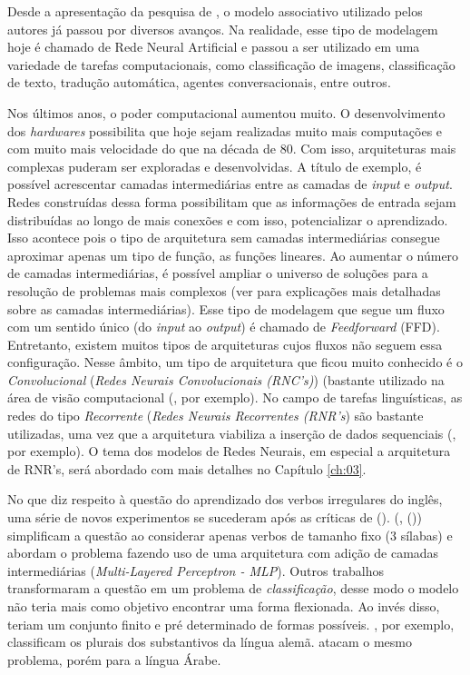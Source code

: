 Desde a apresentação da pesquisa de \cite{rumelhart:1986}, o modelo associativo utilizado pelos autores já passou por diversos avanços. Na realidade, esse tipo de modelagem hoje é chamado de Rede Neural Artificial e passou a ser utilizado em uma variedade de tarefas computacionais, como classificação de imagens, classificação de texto, tradução automática, agentes conversacionais, entre outros. 

Nos últimos anos, o poder computacional aumentou muito. O desenvolvimento dos \textit{hardwares} possibilita que hoje sejam realizadas muito mais computações e com muito mais velocidade do que na década de 80. Com isso, arquiteturas mais complexas puderam ser exploradas e desenvolvidas. A título de exemplo, é possível acrescentar camadas intermediárias entre as camadas de \textit{input} e \textit{output}. Redes construídas dessa forma possibilitam que as informações de entrada sejam distribuídas ao longo de mais conexões e com isso, potencializar o aprendizado. Isso acontece pois o tipo de arquitetura sem camadas intermediárias consegue aproximar apenas um tipo de função, as funções lineares. Ao aumentar o número de camadas intermediárias, é possível ampliar o universo de soluções para a resolução de problemas mais complexos (ver \cite{Goodfellow-et-al-2016} para explicações mais detalhadas sobre as camadas intermediárias). Esse tipo de modelagem que segue um fluxo com um sentido único (do \textit{input} ao \textit{output}) é chamado de \textit{Feedforward} (FFD). Entretanto, existem muitos tipos de arquiteturas cujos fluxos não seguem essa configuração. Nesse âmbito, um tipo de arquitetura que ficou muito conhecido é o \textit{Convolucional} (\textit{Redes Neurais Convolucionais (RNC's)}) (bastante utilizado na área de visão computacional (\cite{Krizhevsky:2012}, por exemplo). No campo de tarefas linguísticas, as redes do tipo \textit{Recorrente} (\textit{Redes Neurais Recorrentes (RNR's}) são bastante utilizadas, uma vez que a arquitetura viabiliza a inserção de dados sequenciais  (\cite{pengfei:2016}, por exemplo). O tema dos modelos de Redes Neurais, em especial a arquitetura de RNR's, será abordado com mais detalhes no Capítulo \ref{ch:03}.

No que diz respeito à questão do aprendizado dos verbos irregulares do inglês, uma série de novos experimentos se sucederam após as críticas de (\cite{Pinker:1988}). (\cite{pluket:1991}, (\citeyear{PLUNKETT:1993})) simplificam a questão ao considerar apenas verbos de tamanho fixo (3 sílabas) e abordam o problema fazendo uso de uma arquitetura com adição de camadas intermediárias (\textit{Multi-Layered Perceptron - MLP}). Outros trabalhos transformaram a questão em um problema de \textit{classificação}, desse modo o modelo não teria mais como objetivo encontrar uma forma flexionada. Ao invés disso, teriam um conjunto finito e pré determinado de formas possíveis. \cite{Nakisa1996WhereDD}, por exemplo, classificam os plurais dos substantivos da língua alemã. \cite{plunkett:1997} atacam o mesmo problema, porém para a língua Árabe.

